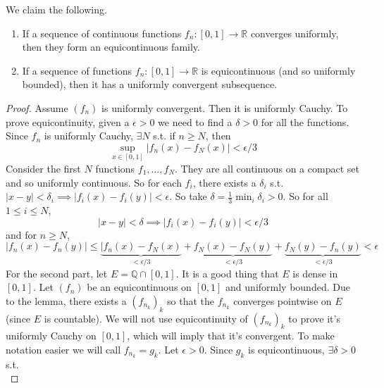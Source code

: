   \begin{theorem}
    We claim the following. 
    \begin{enumerate}
      \item If a sequence of continuous functions $f_n: [0, 1] \to \mathbb{R}$ converges uniformly, then they form an equicontinuous family. 
      \item If a sequence of functions $f_n: [0, 1] \to \mathbb{R}$ is equicontinuous (and so uniformly bounded), then it has a uniformly convergent subsequence. 
    \end{enumerate}
  \end{theorem}
  \begin{proof}
    Assume $(f_n)$ is uniformly convergent. Then it is uniformly Cauchy. To prove equicontinuity, given a $\epsilon > 0$ we need to find a $\delta > 0$ for all the functions. Since $f_n$ is uniformly Cauchy, $\exists N$ s.t. if $n \geq N$, then 
    \begin{equation}
      \sup_{x \in [0, 1]} | f_n (x) - f_N (x) | < \epsilon/3
    \end{equation} 
    Consider the first $N$ functions $f_1, \ldots, f_N$. They are all continuous on a compact set and so uniformly continuous. So for each $f_i$, there exists a $\delta_i$ s.t. $|x - y| < \delta_i \implies |f_i (x) - f_i (y)| < \epsilon$. So take $\delta = \frac{1}{3} \min_i \delta_i > 0$. So for all $1 \leq i \leq N$, 
    \begin{equation}
      |x - y| < \delta \implies |f_i (x) - f_i (y)| < \epsilon/3
    \end{equation} 
    and for $n \geq N$, 
    \begin{equation}
      |f_n (x) - f_n (y)| \leq \underbrace{|f_n (x) - f_N (x)}_{< \epsilon/3} + \underbrace{f_N (x) - f_N (y)}_{< \epsilon/3} + \underbrace{f_N (y) - f_n (y)}_{< \epsilon/3} < \epsilon
    \end{equation} 
    For the second part, let $E = \mathbb{Q} \cap [0, 1]$. It is a good thing that $E$ is dense in $[0, 1]$. Let $(f_n)$ be an equicontinuous on $[0, 1]$ and uniformly bounded. Due to the lemma, there exists a $(f_{n_k})_k$ so that the $f_{n_k}$ converges pointwise on $E$ (since $E$ is countable). We will not use equicontinuity of $(f_{n_k})_k$ to prove it's uniformly Cauchy on $[0, 1]$, which will imply that it's convergent. To make notation easier we will call $f_{n_k} = g_k$. Let $\epsilon > 0$. Since $g_k$ is equicontinuous, $\exists \delta > 0$ s.t. 
    \begin{equation}

\end{equation}
\end{proof}
